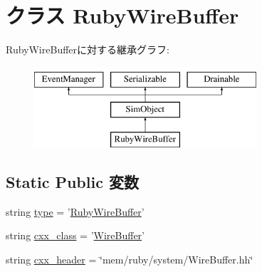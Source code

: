 \hypertarget{classWireBuffer_1_1RubyWireBuffer}{
\section{クラス RubyWireBuffer}
\label{classWireBuffer_1_1RubyWireBuffer}
}
RubyWireBufferに対する継承グラフ:\begin{figure}[H]
\begin{center}
\leavevmode
\includegraphics[height=3cm]{classWireBuffer_1_1RubyWireBuffer}
\end{center}
\end{figure}
\subsection*{Static Public 変数}
\begin{DoxyCompactItemize}
\item 
string \hyperlink{classWireBuffer_1_1RubyWireBuffer_acce15679d830831b0bbe8ebc2a60b2ca}{type} = '\hyperlink{classWireBuffer_1_1RubyWireBuffer}{RubyWireBuffer}'
\item 
string \hyperlink{classWireBuffer_1_1RubyWireBuffer_a58cd55cd4023648e138237cfc0822ae3}{cxx\_\-class} = '\hyperlink{classWireBuffer}{WireBuffer}'
\item 
string \hyperlink{classWireBuffer_1_1RubyWireBuffer_a17da7064bc5c518791f0c891eff05fda}{cxx\_\-header} = \char`\"{}mem/ruby/system/WireBuffer.hh\char`\"{}
\end{DoxyCompactItemize}


